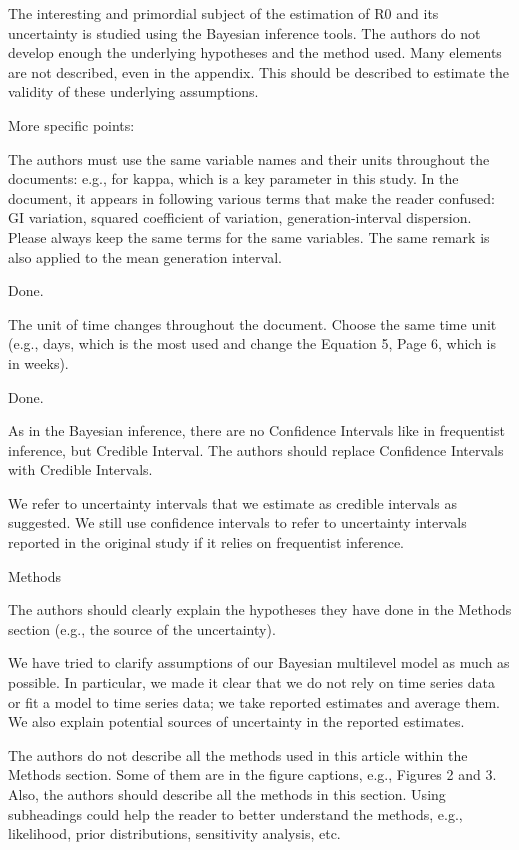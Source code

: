 \documentclass[12pt]{article}
\newcommand{\revtext}{\textsf}
\begin{document}
\revtext{The interesting and primordial subject of the estimation of R0 and its uncertainty is studied using
the Bayesian inference tools. The authors do not develop enough the underlying hypotheses
and the method used. Many elements are not described, even in the appendix. This should be
described to estimate the validity of these underlying assumptions.}

\revtext{More specific points:}

\revtext{The authors must use the same variable names and their units throughout the documents: e.g.,
for kappa, which is a key parameter in this study. In the document, it appears in following
various terms that make the reader confused: GI variation, squared coefficient of variation,
generation-interval dispersion. Please always keep the same terms for the same variables. The
same remark is also applied to the mean generation interval.}

Done.

\revtext{The unit of time changes throughout the document. Choose the same time unit (e.g., days,
which is the most used and change the Equation 5, Page 6, which is in weeks).}

Done.

\revtext{As in the Bayesian inference, there are no Confidence Intervals like in frequentist inference, but
Credible Interval. The authors should replace Confidence Intervals with Credible Intervals.}

We refer to uncertainty intervals that we estimate as credible intervals as suggested. We still use confidence intervals to refer to uncertainty intervals reported in the original study if it relies on frequentist inference.

\revtext{Methods}

\revtext{The authors should clearly explain the hypotheses they have done in the Methods section (e.g.,
the source of the uncertainty).}

We have tried to clarify assumptions of our Bayesian multilevel model as much as possible. 
In particular, we made it clear that we do not rely on time series data or fit a model to time series data; 
we take reported estimates and average them.
We also explain potential sources of uncertainty in the reported estimates.

\revtext{The authors do not describe all the methods used in this article within the Methods section.
Some of them are in the figure captions, e.g., Figures 2 and 3. Also, the authors should describe
all the methods in this section. Using subheadings could help the reader to better understand
the methods, e.g., likelihood, prior distributions, sensitivity analysis, etc.}
\end{document}
